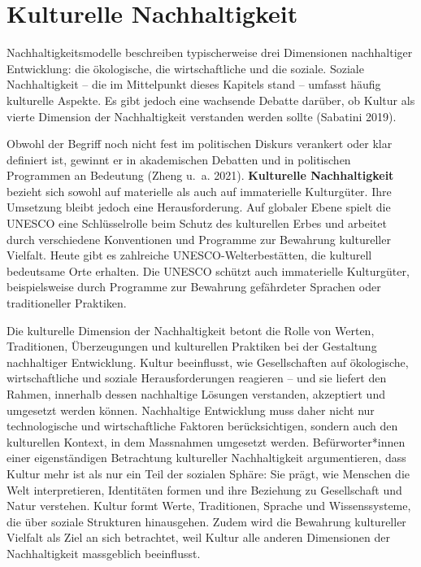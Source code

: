 \documentclass[
  nswissgerman,
  a4paper,
  openany]{book}
\begin{document}
\section{Kulturelle Nachhaltigkeit}\label{kulturelle-nachhaltigkeit}

Nachhaltigkeitsmodelle beschreiben typischerweise drei Dimensionen
nachhaltiger Entwicklung: die ökologische, die wirtschaftliche und die
soziale. Soziale Nachhaltigkeit -- die im Mittelpunkt dieses Kapitels
stand -- umfasst häufig kulturelle Aspekte. Es gibt jedoch eine
wachsende Debatte darüber, ob Kultur als vierte Dimension der
Nachhaltigkeit verstanden werden sollte (Sabatini 2019).

Obwohl der Begriff noch nicht fest im politischen Diskurs verankert oder
klar definiert ist, gewinnt er in akademischen Debatten und in
politischen Programmen an Bedeutung (Zheng u.~a. 2021).
\textbf{Kulturelle Nachhaltigkeit} bezieht sich sowohl auf materielle
als auch auf immaterielle Kulturgüter. Ihre Umsetzung bleibt jedoch eine
Herausforderung. Auf globaler Ebene spielt die UNESCO eine
Schlüsselrolle beim Schutz des kulturellen Erbes und arbeitet durch
verschiedene Konventionen und Programme zur Bewahrung kultureller
Vielfalt. Heute gibt es zahlreiche UNESCO-Welterbestätten, die kulturell
bedeutsame Orte erhalten. Die UNESCO schützt auch immaterielle
Kulturgüter, beispielsweise durch Programme zur Bewahrung gefährdeter
Sprachen oder traditioneller Praktiken.

Die kulturelle Dimension der Nachhaltigkeit betont die Rolle von Werten,
Traditionen, Überzeugungen und kulturellen Praktiken bei der Gestaltung
nachhaltiger Entwicklung. Kultur beeinflusst, wie Gesellschaften auf
ökologische, wirtschaftliche und soziale Herausforderungen reagieren --
und sie liefert den Rahmen, innerhalb dessen nachhaltige Lösungen
verstanden, akzeptiert und umgesetzt werden können. Nachhaltige
Entwicklung muss daher nicht nur technologische und wirtschaftliche
Faktoren berücksichtigen, sondern auch den kulturellen Kontext, in dem
Massnahmen umgesetzt werden. Befürworter*innen einer eigenständigen
Betrachtung kultureller Nachhaltigkeit argumentieren, dass Kultur mehr
ist als nur ein Teil der sozialen Sphäre: Sie prägt, wie Menschen die
Welt interpretieren, Identitäten formen und ihre Beziehung zu
Gesellschaft und Natur verstehen. Kultur formt Werte, Traditionen,
Sprache und Wissenssysteme, die über soziale Strukturen hinausgehen.
Zudem wird die Bewahrung kultureller Vielfalt als Ziel an sich
betrachtet, weil Kultur alle anderen Dimensionen der Nachhaltigkeit
massgeblich beeinflusst.
\end{document}
